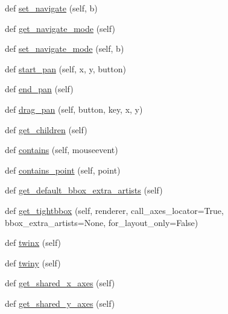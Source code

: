 \begin{DoxyCompactItemize}
\item 
def \hyperlink{classmatplotlib_1_1axes_1_1__base_1_1__AxesBase_ade75a474d47b83225249001d0d209346}{set\+\_\+navigate} (self, b)
\item 
def \hyperlink{classmatplotlib_1_1axes_1_1__base_1_1__AxesBase_ab36355fa9179b4e39db4a7dbc2694692}{get\+\_\+navigate\+\_\+mode} (self)
\item 
def \hyperlink{classmatplotlib_1_1axes_1_1__base_1_1__AxesBase_aa8ed4cd88d9473643ae5df4f714a06d2}{set\+\_\+navigate\+\_\+mode} (self, b)
\item 
def \hyperlink{classmatplotlib_1_1axes_1_1__base_1_1__AxesBase_afe9efa6be4449650a9ee522c58877cfd}{start\+\_\+pan} (self, x, y, button)
\item 
def \hyperlink{classmatplotlib_1_1axes_1_1__base_1_1__AxesBase_a968a08985879050f4198b4043b132eb4}{end\+\_\+pan} (self)
\item 
def \hyperlink{classmatplotlib_1_1axes_1_1__base_1_1__AxesBase_a05aa8b811347f35ff1d4425d765be107}{drag\+\_\+pan} (self, button, key, x, y)
\item 
def \hyperlink{classmatplotlib_1_1axes_1_1__base_1_1__AxesBase_a3f3b81bfe80922e9f27b1913e58461a7}{get\+\_\+children} (self)
\item 
def \hyperlink{classmatplotlib_1_1axes_1_1__base_1_1__AxesBase_a1114df4c40337e9fdde94644ed22aa79}{contains} (self, mouseevent)
\item 
def \hyperlink{classmatplotlib_1_1axes_1_1__base_1_1__AxesBase_a7009f76ebf05e603b5d7529a1c9df7b2}{contains\+\_\+point} (self, point)
\item 
def \hyperlink{classmatplotlib_1_1axes_1_1__base_1_1__AxesBase_a30ce0eb8b2aba77db1c57fccc9233906}{get\+\_\+default\+\_\+bbox\+\_\+extra\+\_\+artists} (self)
\item 
def \hyperlink{classmatplotlib_1_1axes_1_1__base_1_1__AxesBase_ae7804f291d9ca2bb96c76e81d3b0c36d}{get\+\_\+tightbbox} (self, renderer, call\+\_\+axes\+\_\+locator=True, bbox\+\_\+extra\+\_\+artists=None, for\+\_\+layout\+\_\+only=False)
\item 
def \hyperlink{classmatplotlib_1_1axes_1_1__base_1_1__AxesBase_a8d195fa80fa2f02dd9d5d0108a716d48}{twinx} (self)
\item 
def \hyperlink{classmatplotlib_1_1axes_1_1__base_1_1__AxesBase_acc6747800d47cae82e9f179862b90da4}{twiny} (self)
\item 
def \hyperlink{classmatplotlib_1_1axes_1_1__base_1_1__AxesBase_a1155f4e9b4f40e063d28406a8afeea73}{get\+\_\+shared\+\_\+x\+\_\+axes} (self)
\item 
def \hyperlink{classmatplotlib_1_1axes_1_1__base_1_1__AxesBase_a7afa7a2751a5969795ae560b4343f63c}{get\+\_\+shared\+\_\+y\+\_\+axes} (self)
\end{DoxyCompactItemize}
